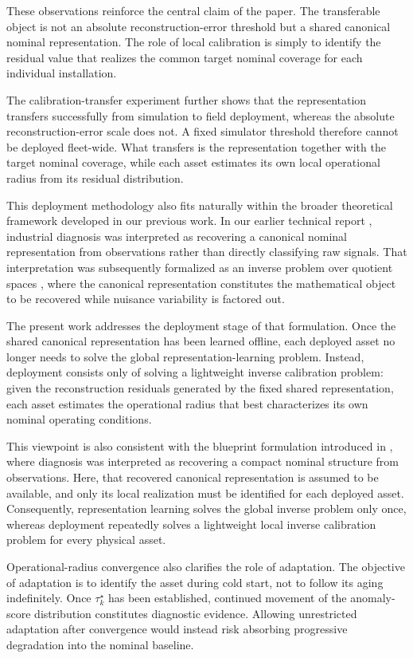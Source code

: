 \documentclass[11pt,a4paper]{article}
\begin{document}
These observations reinforce the central claim of the paper. The transferable object is not an
absolute reconstruction-error threshold but a shared canonical nominal representation. The role
of local calibration is simply to identify the residual value that realizes the common target
nominal coverage for each individual installation.

The calibration-transfer experiment further shows that the representation transfers successfully
from simulation to field deployment, whereas the absolute reconstruction-error scale does not.
A fixed simulator threshold therefore cannot be deployed fleet-wide. What transfers is the
representation together with the target nominal coverage, while each asset estimates its own
local operational radius from its residual distribution.

This deployment methodology also fits naturally within the broader theoretical framework
developed in our previous work. In our earlier technical report
\cite{disanti2026inverse}, industrial diagnosis was interpreted as recovering a canonical
nominal representation from observations rather than directly classifying raw signals.
That interpretation was subsequently formalized as an inverse problem over quotient spaces
\cite{disanti2026quotient}, where the canonical representation constitutes the mathematical
object to be recovered while nuisance variability is factored out.

The present work addresses the deployment stage of that formulation. Once the shared canonical
representation has been learned offline, each deployed asset no longer needs to solve the global
representation-learning problem. Instead, deployment consists only of solving a lightweight
inverse calibration problem: given the reconstruction residuals generated by the fixed shared
representation, each asset estimates the operational radius that best characterizes its own
nominal operating conditions.

This viewpoint is also consistent with the blueprint formulation introduced in
\cite{disanti2025blueprints}, where diagnosis was interpreted as recovering a compact nominal
structure from observations. Here, that recovered canonical representation is assumed to be
available, and only its local realization must be identified for each deployed asset.
Consequently, representation learning solves the global inverse problem only once, whereas
deployment repeatedly solves a lightweight local inverse calibration problem for every physical
asset.

Operational-radius convergence also clarifies the role of adaptation. The objective of
adaptation is to identify the asset during cold start, not to follow its aging indefinitely.
Once $\tau_k^\star$ has been established, continued movement of the anomaly-score distribution
constitutes diagnostic evidence. Allowing unrestricted adaptation after convergence would instead
risk absorbing progressive degradation into the nominal baseline.
\end{document}
